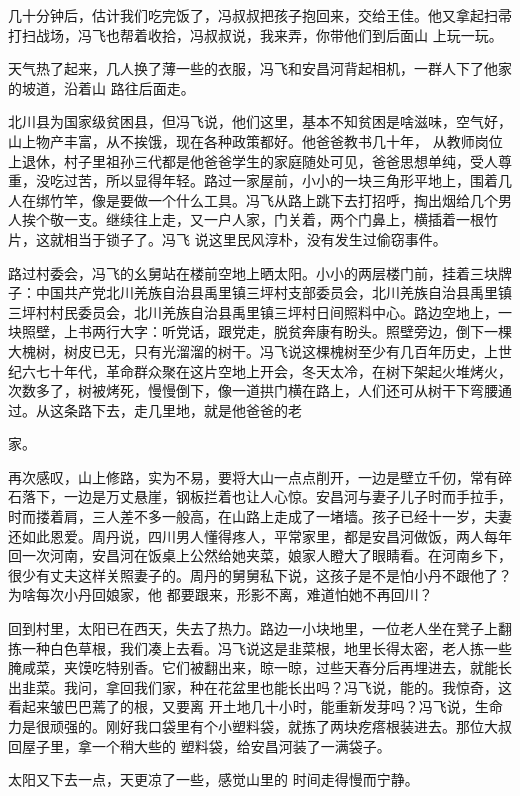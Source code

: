 \documentclass{article}
\begin{document}
几十分钟后，估计我们吃完饭了，冯叔叔把孩子抱回来，交给王佳。他又拿起扫帚打扫战场，冯飞也帮着收拾，冯叔叔说，我来弄，你带他们到后面山
上玩一玩。 

天气热了起来，几人换了薄一些的衣服，冯飞和安昌河背起相机，一群人下了他家的坡道，沿着山
路往后面走。 

北川县为国家级贫困县，但冯飞说，他们这里，基本不知贫困是啥滋味，空气好，山上物产丰富，从不挨饿，现在各种政策都好。他爸爸教书几十年，
\newpage
从教师岗位上退休，村子里祖孙三代都是他爸爸学生的家庭随处可见，爸爸思想单纯，受人尊重，没吃过苦，所以显得年轻。路过一家屋前，小小的一块三角形平地上，围着几人在绑竹竿，像是要做一个什么工具。冯飞从路上跳下去打招呼，掏出烟给几个男人挨个敬一支。继续往上走，又一户人家，门关着，两个门鼻上，横插着一根竹片，这就相当于锁子了。冯飞
说这里民风淳朴，没有发生过偷窃事件。 

路过村委会，冯飞的幺舅站在楼前空地上晒太阳。小小的两层楼门前，挂着三块牌子：中国共产党北川羌族自治县禹里镇三坪村支部委员会，北川羌族自治县禹里镇三坪村村民委员会，北川羌族自治县禹里镇三坪村日间照料中心。路边空地上，一块照壁，上书两行大字：听党话，跟党走，脱贫奔康有盼头。照壁旁边，倒下一棵大槐树，树皮已无，只有光溜溜的树干。冯飞说这棵槐树至少有几百年历史，上世纪六七十年代，革命群众聚在这片空地上开会，冬天太冷，在树下架起火堆烤火，次数多了，树被烤死，慢慢倒下，像一道拱门横在路上，人们还可从树干下弯腰通过。从这条路下去，走几里地，就是他爸爸的老
\newpage

家。 

再次感叹，山上修路，实为不易，要将大山一点点削开，一边是壁立千仞，常有碎石落下，一边是万丈悬崖，钢板拦着也让人心惊。安昌河与妻子儿子时而手拉手，时而搂着肩，三人差不多一般高，在山路上走成了一堵墙。孩子已经十一岁，夫妻还如此恩爱。周丹说，四川男人懂得疼人，平常家里，都是安昌河做饭，两人每年回一次河南，安昌河在饭桌上公然给她夹菜，娘家人瞪大了眼睛看。在河南乡下，很少有丈夫这样关照妻子的。周丹的舅舅私下说，这孩子是不是怕小丹不跟他了？为啥每次小丹回娘家，他
都要跟来，形影不离，难道怕她不再回川？ 

回到村里，太阳已在西天，失去了热力。路边一小块地里，一位老人坐在凳子上翻拣一种白色草根，我们凑上去看。冯飞说这是韭菜根，地里长得太密，老人拣一些腌咸菜，夹馍吃特别香。它们被翻出来，晾一晾，过些天春分后再埋进去，就能长出韭菜。我问，拿回我们家，种在花盆里也能长出吗？冯飞说，能的。我惊奇，这看起来皱巴巴蔫了的根，又要离
\newpage
开土地几十小时，能重新发芽吗？冯飞说，生命力是很顽强的。刚好我口袋里有个小塑料袋，就拣了两块疙瘩根装进去。那位大叔回屋子里，拿一个稍大些的
塑料袋，给安昌河装了一满袋子。 

太阳又下去一点，天更凉了一些，感觉山里的
时间走得慢而宁静。 
\end{document}
